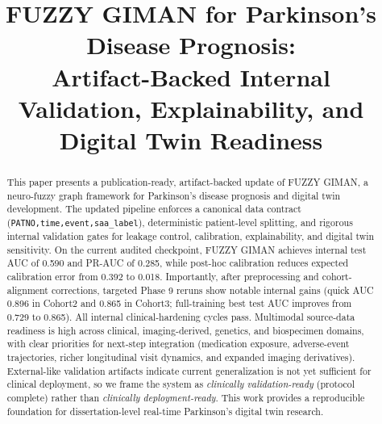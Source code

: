 \documentclass[conference]{IEEEtran}
\begin{document}
\title{FUZZY GIMAN for Parkinson's Disease Prognosis:\\
Artifact-Backed Internal Validation, Explainability, and Digital Twin Readiness}

\author{
\and
{}
}

\maketitle

\begin{abstract}
This paper presents a publication-ready, artifact-backed update of FUZZY GIMAN, a neuro-fuzzy graph framework for Parkinson's disease prognosis and digital twin development. The updated pipeline enforces a canonical data contract (\texttt{PATNO,time,event,saa\_label}), deterministic patient-level splitting, and rigorous internal validation gates for leakage control, calibration, explainability, and digital twin sensitivity. On the current audited checkpoint, FUZZY GIMAN achieves internal test AUC of 0.590 and PR-AUC of 0.285, while post-hoc calibration reduces expected calibration error from 0.392 to 0.018. Importantly, after preprocessing and cohort-alignment corrections, targeted Phase 9 reruns show notable internal gains (quick AUC 0.896 in Cohort2 and 0.865 in Cohort3; full-training best test AUC improves from 0.729 to 0.865). All internal clinical-hardening cycles pass. Multimodal source-data readiness is high across clinical, imaging-derived, genetics, and biospecimen domains, with clear priorities for next-step integration (medication exposure, adverse-event trajectories, richer longitudinal visit dynamics, and expanded imaging derivatives). External-like validation artifacts indicate current generalization is not yet sufficient for clinical deployment, so we frame the system as \emph{clinically validation-ready} (protocol complete) rather than \emph{clinically deployment-ready}. This work provides a reproducible foundation for dissertation-level real-time Parkinson's digital twin research.
\end{abstract}
\end{document}
